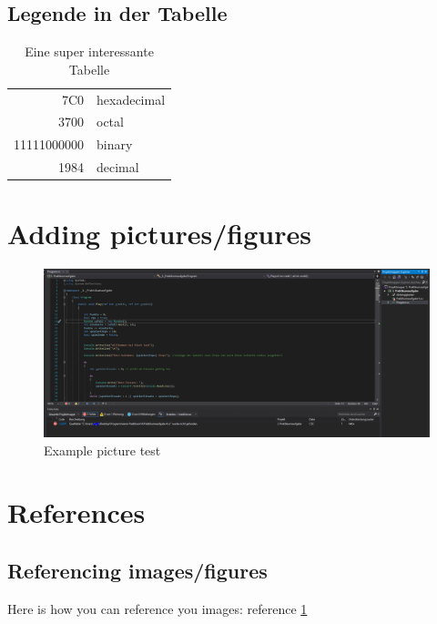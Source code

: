 \newpage
\subsection{Legende in der Tabelle}

\begin{table}[htb]
    \begin{tabular}{|r|l|}
        \hline
        7C0         & hexadecimal \\
        3700        & octal       \\ \cline{2-2}
        11111000000 & binary      \\
        \hline \hline
        1984        & decimal     \\
        \hline
    \end{tabular}
    \caption{Eine super interessante Tabelle}
    \label{tab:supertabelle}
\end{table}

\newpage

\section{Adding pictures/figures}
\begin{figure}[!htb]
    \begin{center}
        \includegraphics[width=\textwidth, keepaspectratio]{figures/example.PNG}
        \caption{Example picture test}
        \label{example_pic}
    \end{center}
\end{figure}

\section{References}

\subsection{Referencing images/figures}
Here is how you can reference you images: reference \ref{example_pic}

